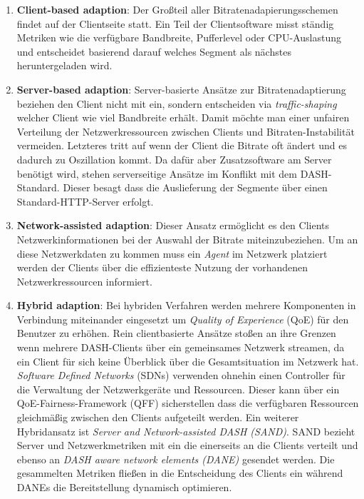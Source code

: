 \documentclass[paper = a4, fontsize = 12pt, parskip = half]{scrartcl} %
\begin{document}
\begin{enumerate}
	\item \textbf{Client-based adaption}: Der Großteil aller Bitratenadapierungsschemen findet auf der Clientseite statt. Ein Teil der Clientsoftware misst ständig Metriken wie die verfügbare Bandbreite, Pufferlevel oder CPU-Auslastung und entscheidet basierend darauf welches Segment als nächstes heruntergeladen wird. 
	\item \textbf{Server-based adaption}: Server-basierte Ansätze zur Bitratenadaptierung beziehen den Client nicht mit ein, sondern entscheiden via \textit{traffic-shaping} welcher Client wie viel Bandbreite erhält. Damit möchte man einer unfairen Verteilung der Netzwerkressourcen zwischen Clients und Bitraten-Instabilität vermeiden. Letzteres tritt auf wenn der Client die Bitrate oft ändert und es dadurch zu Oszillation kommt. Da dafür aber Zusatzsoftware am Server benötigt wird, stehen serverseitige Ansätze im Konflikt mit dem DASH-Standard. Dieser besagt dass die Auslieferung der Segmente über einen Standard-HTTP-Server erfolgt.
	\item \textbf{Network-assisted adaption}: Dieser Ansatz ermöglicht es den Clients Netzwerkinformationen bei der Auswahl der Bitrate miteinzubeziehen. Um an diese Netzwerkdaten zu kommen muss ein \textit{Agent} im Netzwerk platziert werden der Clients über die effizienteste Nutzung der vorhandenen Netzwerkressourcen informiert.
	\item \textbf{Hybrid adaption}: Bei hybriden Verfahren werden mehrere Komponenten in Verbindung miteinander eingesetzt um \textit{Quality of Experience} (QoE) für den Benutzer zu erhöhen. Rein clientbasierte Ansätze stoßen an ihre Grenzen wenn mehrere DASH-Clients über ein gemeinsames Netzwerk streamen, da ein Client für sich keine Überblick über die Gesamtsituation im Netzwerk hat. \textit{Software Defined Networks} (SDNs) verwenden ohnehin einen Controller für die Verwaltung der Netzwerkgeräte und Ressourcen. Dieser kann über ein QoE-Fairness-Framework (QFF) sicherstellen dass die verfügbaren Ressourcen gleichmäßig zwischen den Clients aufgeteilt werden. Ein weiterer Hybridansatz ist \textit{Server and Network-assisted DASH (SAND)}. SAND bezieht Server und Netzwerkmetriken mit ein die einerseits an die Clients verteilt und ebenso an \textit{DASH aware network elements (DANE)} gesendet werden. Die gesammelten Metriken fließen in die Entscheidung des Clients ein während DANEs die Bereitstellung dynamisch optimieren.
\end{enumerate}
\end{document}
